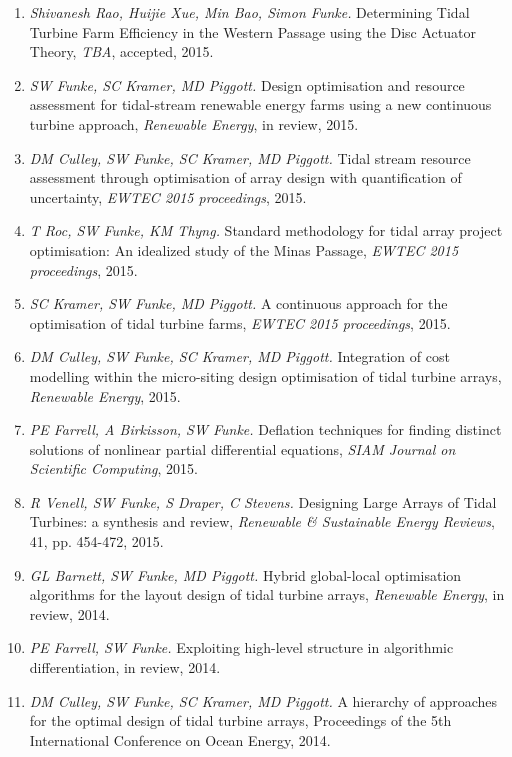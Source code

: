 \documentclass[11pt]{article}
\begin{document}
\newpage
{}
\begin{enumerate}
    \item \textit{Shivanesh Rao, Huijie Xue, Min Bao, Simon Funke.} Determining Tidal Turbine Farm Efficiency in the Western Passage using the Disc Actuator Theory, \textit{TBA}, accepted, 2015.
\item \textit{SW Funke, SC Kramer, MD Piggott.} Design optimisation and resource assessment for tidal-stream renewable energy farms using a new continuous turbine approach, \textit{Renewable Energy}, in review, 2015.
\item \textit{DM Culley, SW Funke, SC Kramer, MD Piggott.} Tidal stream resource assessment through optimisation of array design with quantification of uncertainty, \textit{EWTEC 2015 proceedings}, 2015.
\item \textit{T Roc, SW Funke, KM Thyng.} Standard methodology for tidal array project optimisation: An idealized study of the Minas Passage, \textit{EWTEC 2015 proceedings}, 2015.
\item \textit{SC Kramer, SW Funke, MD Piggott.} A continuous approach for the optimisation of tidal turbine farms, \textit{EWTEC 2015 proceedings}, 2015.
\item \textit{DM Culley, SW Funke, SC Kramer, MD Piggott.} Integration of cost modelling within the micro-siting design optimisation of tidal turbine arrays, \textit{Renewable Energy}, 2015.
\item \textit{PE Farrell, A Birkisson, SW Funke.} Deflation techniques for finding distinct solutions of nonlinear partial differential equations, \textit{SIAM Journal on Scientific Computing}, 2015.
\item \textit{R Venell, SW Funke, S Draper, C Stevens.} Designing Large Arrays of Tidal Turbines: a synthesis and review, \textit{Renewable \& Sustainable Energy Reviews}, 41, pp. 454-472, 2015.
\item \textit{GL Barnett, SW Funke, MD Piggott.} Hybrid global-local optimisation algorithms for the layout design of tidal turbine arrays, \textit{Renewable Energy}, in review, 2014.
\item \textit{PE Farrell, SW Funke.} Exploiting high-level structure in
    algorithmic differentiation, in review, 2014.
\item \textit{DM Culley, SW Funke, SC Kramer, MD Piggott.} A hierarchy of approaches for the optimal design of tidal turbine arrays, Proceedings of the 5th International Conference on Ocean Energy, 2014.

\end{enumerate}
\end{document}
